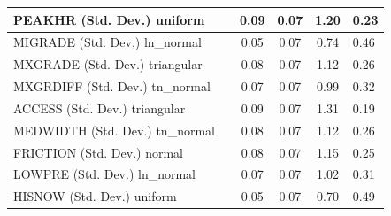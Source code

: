\begin{table}
\begin{center}
\begin{tabular}{|l|l|c|c|c|l|}
			\hline
			PEAKHR (Std. Dev.) uniform &  & 0.09 & 0.07 & 1.20 & 0.23 \\
			\hline
			MIGRADE (Std. Dev.) ln_normal &  & 0.05 & 0.07 & 0.74 & 0.46 \\
			\hline
			MXGRADE (Std. Dev.) triangular &  & 0.08 & 0.07 & 1.12 & 0.26 \\
			\hline
			MXGRDIFF (Std. Dev.) tn_normal &  & 0.07 & 0.07 & 0.99 & 0.32 \\
			\hline
			ACCESS (Std. Dev.) triangular &  & 0.09 & 0.07 & 1.31 & 0.19 \\
			\hline
			MEDWIDTH (Std. Dev.) tn_normal &  & 0.08 & 0.07 & 1.12 & 0.26 \\
			\hline
			FRICTION (Std. Dev.) normal &  & 0.08 & 0.07 & 1.15 & 0.25 \\
			\hline
			LOWPRE (Std. Dev.) ln_normal &  & 0.07 & 0.07 & 1.02 & 0.31 \\
			\hline
			HISNOW (Std. Dev.) uniform &  & 0.05 & 0.07 & 0.70 & 0.49 \\
			\hline
		\end{tabular}
	\end{center}
\end{table}